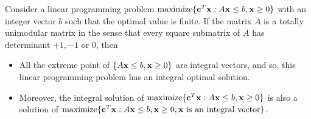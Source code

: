 \begin{theorem}
    Consider a linear programming problem \(\text{maximize}\{\mathbf{c}^T\mathbf{x} : A\mathbf{x} \leq b, \mathbf{x} \geq 0\}\) with an integer vector \(b\) such that the optimal value is finite. If the matrix \(A\) is a totally unimodular matrix in the sense that every square submatrix of \(A\) has determinant \(+1, -1\) or \(0\), then
    \begin{itemize}
        \item All the extreme point of \(\{A \mathbf{x} \leq b, \mathbf{x} \geq 0\}\) are integral vectors, and so, this linear programming problem has an integral optimal solution.
        \item Moreover, the integral solution of \(\text{maximize}\{\mathbf{c}^T \mathbf{x} : A\mathbf{x} \leq b, \mathbf{x} \geq 0\}\) is also a solution of \(\text{maximize}\{\mathbf{c}^T \mathbf{x} : A\mathbf{x} \leq b, \mathbf{x} \geq 0, \mathbf{x} \text{ is an integral vector}\}\).
    \end{itemize}
\end{theorem}